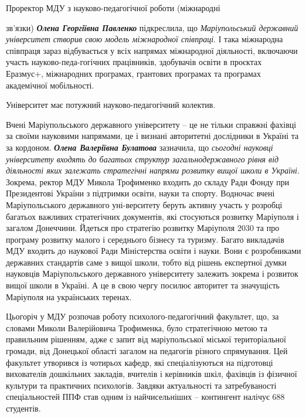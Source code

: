 
Проректор МДУ з науково-педагогічної роботи (міжнародні\par\noindent зв'язки) \emph{\textbf{Олена
Георгіївна Павленко}} підкреслила, що \emph{Маріупольський державний університет
створив свою модель міжнародної співпраці}. І така міжнародна співпраця зараз
відбувається у всіх напрямах міжнародної діяльності, включаючи участь
науково-педа\hyp{}гогічних працівників, здобувачів освіти в проєктах Еразмус+,
міжнародних програмах, грантових програмах та програмах академічної
мобільності.


Університет має потужний науково-педагогічний колектив.\par\noindent Вчені Маріупольського
державного університету – це не тільки справжні фахівці за своїми науковими
напрямами, це і визнані авторитетні дослідники в Україні та за кордоном. \emph{\textbf{Олена
Валеріївна Булатова}} зазначила, що \emph{сьогодні науковці університету входять до
багатьох структур загальнодержавного рівня від діяльності яких залежать
стратегічні напрями розвитку вищої школи в Україні}. Зокрема, ректор МДУ Микола
Трофименко входить до складу Ради Фонду при Президентові України з підтримки
освіти, науки та спорту. Водночас вчені Маріупольського державного уні\hyp{}верситету
беруть активну участь у розробці багатьох важливих стратегічних документів, які
стосуються розвитку Маріуполя і загалом Донеччини. Йдеться про стратегію
розвитку Маріуполя 2030 та про програму розвитку малого і середнього бізнесу та
туризму. Багато викладачів МДУ входить до наукової Ради Міністерства освіти і
науки. Вони є розробниками державних стандартів саме з вищої школи, тобто від
рішень експертної думки науковців Маріупольського державного університету
залежить зокрема і розвиток вищої школи в Україні. А це в свою чергу посилює
авторитет  та значущість Маріуполя на українських теренах.


Цьогоріч у МДУ розпочав роботу психолого-педагогічний факультет, що, за словами
Миколи Валерійовича Трофименка, було стратегічною метою та правильним рішенням,
адже є запит від маріупольської міської територіальної громади, від Донецької
області загалом на педагогів різного спрямування. Цей факультет утворився із
чотирьох кафедр, які спеціалізуються на підготовці вихователів дошкільних
закладів, вчителів і керівників шкіл, фахівців із фізичної культури та
практичних психологів. Завдяки актуальності та затребуваності спеціальностей
ППФ став одним із найчисельніших – контингент налічує 688 студентів.

